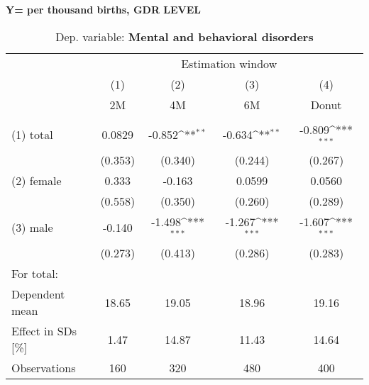 \documentclass{scrartcl} %
\begin{document}
\textbf{Y= per thousand births, GDR LEVEL}
 \begin{table}[htbp] \centering 
 \begin{threeparttable} \centering 
 \caption{Dep. variable: \textbf{Mental and behavioral disorders}} 
 {\def\sym#1{\ifmmode^{#1}\else\(^{#1}\)\fi} 
 \begin{tabular}{l*{4}{c}} \toprule & \multicolumn{4}{c}{Estimation window} \\ \cmidrule(lr){2-5}
	&\multicolumn{1}{c}{(1)}&\multicolumn{1}{c}{(2)}&\multicolumn{1}{c}{(3)}&\multicolumn{1}{c}{(4)}\\
    &\multicolumn{1}{c}{2M}&\multicolumn{1}{c}{4M}&\multicolumn{1}{c}{6M}&\multicolumn{1}{c}{Donut}\\
	\midrule
\\
(1) total	& 0.0829  &-0.852\sym{**} &-0.634\sym{**} & -0.809\sym{***} \\
			& (0.353) & (0.340) 		&(0.244)		&  (0.267) \\
(2) female	& 0.333   &	-0.163 & 0.0599 	 & 0.0560 \\
			& (0.558) & (0.350) & (0.260) &  (0.289) \\
(3) male & -0.140  & -1.498\sym{***} &  -1.267\sym{***} & -1.607\sym{***} \\
 		 & (0.273) &  (0.413)  & (0.286)    &  (0.283) \\
\midrule
For total: \\ 
Dependent mean &   18.65 & 19.05 & 18.96 & 19.16	\\ 
Effect in SDs [\%]  &  1.47 & 14.87 &  11.43 & 14.64 \\ 
Observations & 160 & 320 & 480 & 400 \\ 
\bottomrule
\end{tabular}}
\end{threeparttable} \end{table}
\end{document}
